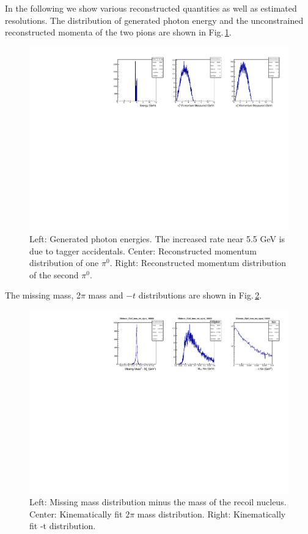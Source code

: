In the following we show various reconstructed quantities as well as
estimated resolutions. The distribution of generated photon energy and
the unconstrained reconstructed momenta of the two pions are shown in
Fig.\,\ref{fig:EgP1P2_signal_DSelector}.
\begin{figure}[tph]
\centering
\includegraphics[width=6in]{figures/EgP1P2_signal_DSelector.pdf}
\caption{Left: Generated photon energies. The increased rate near 5.5 GeV is due to tagger accidentals. Center: Reconstructed momentum distribution of one $\pi^0$. Right: Reconstructed momentum distribution of the second $\pi^0$.
\label{fig:EgP1P2_signal_DSelector}}
\end{figure}
The missing mass, 2$\pi$ mass and $-t$ distributions are shown in Fig.\,\ref{fig:MMMpipit_signal_DSelector}.
\begin{figure}[tph]
\centering
\includegraphics[width=6in]{figures/MMMpipit_signal_DSelector.pdf}
\caption{Left: Missing mass distribution minus the mass of the recoil nucleus. Center: Kinematically fit $2\pi$ mass distribution. Right: Kinematically fit -t distribution.
\label{fig:MMMpipit_signal_DSelector}}
\end{figure}
